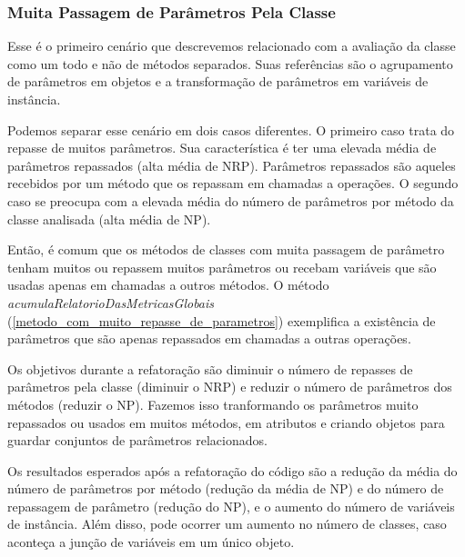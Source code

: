           

\subsubsection{Muita Passagem de Parâmetros Pela Classe}
	
	Esse é o primeiro cenário que descrevemos relacionado com a avaliação da classe como um todo e não de métodos separados. Suas referências são o agrupamento de parâmetros em objetos e a transformação de parâmetros em variáveis de instância.
	
	Podemos separar esse cenário em dois casos diferentes. O primeiro caso trata do repasse de muitos parâmetros. Sua característica é ter uma elevada média de parâmetros repassados (alta média de NRP). Parâmetros repassados são aqueles recebidos por um método que os repassam em chamadas a operações. O segundo caso se preocupa com a elevada média do número de parâmetros por método da classe analisada (alta média de NP).       
		     
	Então, é comum que os métodos de classes com muita passagem de parâmetro tenham muitos ou repassem muitos parâmetros ou recebam variáveis que são usadas apenas em chamadas a outros métodos.	O método \textit{acumulaRelatorioDasMetricasGlobais} (\ref{metodo_com_muito_repasse_de_parametros}) exemplifica a existência de parâmetros que são apenas repassados em chamadas a outras operações.
	                                                               
                                     
	
	Os objetivos durante a refatoração são diminuir o número de repasses de parâmetros pela classe (diminuir o NRP) e reduzir o número de parâmetros dos métodos (reduzir o NP). Fazemos isso tranformando os parâmetros muito repassados ou usados em muitos métodos, em atributos e criando objetos para guardar conjuntos de parâmetros relacionados.
	
	Os resultados esperados após a refatoração do código são a redução da média do número de parâmetros por método (redução da média de NP) e do número de repassagem de parâmetro (redução do NP), e o aumento do número de variáveis de instância. Além disso, pode ocorrer um aumento no número de classes, caso aconteça a junção de variáveis em um único objeto.	           


